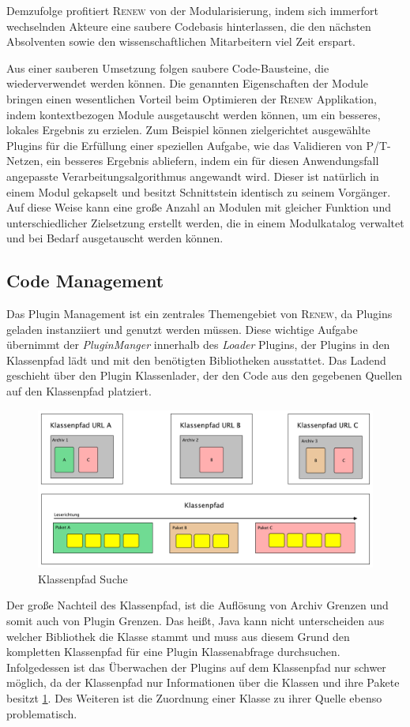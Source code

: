 		Demzufolge profitiert \textsc{Renew} von der Modularisierung, indem sich immerfort wechselnden Akteure eine saubere Codebasis hinterlassen, die den nächsten Absolventen sowie den wissenschaftlichen Mitarbeitern viel Zeit erspart. \bigbreak

		Aus einer sauberen Umsetzung folgen saubere Code-Bausteine, die wiederverwendet werden können. Die genannten Eigenschaften der Module bringen einen wesentlichen Vorteil beim Optimieren der \textsc{Renew} Applikation, indem kontextbezogen Module ausgetauscht werden können, um ein besseres, lokales Ergebnis zu erzielen. Zum Beispiel können zielgerichtet ausgewählte Plugins für die Erfüllung einer speziellen Aufgabe, wie das Validieren von P/T-Netzen, ein besseres Ergebnis abliefern, indem ein für diesen Anwendungsfall angepasste Verarbeitungsalgorithmus angewandt wird. Dieser ist natürlich in einem Modul gekapselt und besitzt Schnittstein identisch zu seinem Vorgänger. Auf diese Weise kann eine große Anzahl an Modulen mit gleicher Funktion und unterschiedlicher Zielsetzung erstellt werden, die in einem Modulkatalog verwaltet und bei Bedarf ausgetauscht werden können.

	\subsection{Code Management}\label{sub:code_managment}
		Das Plugin Management ist ein zentrales Themengebiet von \textsc{Renew}, da Plugins geladen instanziiert und genutzt werden müssen. Diese wichtige Aufgabe übernimmt der \textit{PluginManger} innerhalb des \textit{Loader} Plugins, der Plugins in den Klassenpfad lädt und mit den benötigten Bibliotheken ausstattet. Das Ladend geschieht über den Plugin Klassenlader, der den Code aus den gegebenen Quellen auf den Klassenpfad platziert.\bigbreak
		\begin{figure}[t]
		  \centering
		  \includegraphics[width=\textwidth]{material/images/Klassenpfad.pdf}
		  \caption{Klassenpfad Suche \cite{kothagal2017modular}}
		  \label{fig:CP_Struktur}
		\end{figure}
		Der große Nachteil des Klassenpfad, ist die Auflösung von Archiv Grenzen und somit auch von Plugin Grenzen. Das heißt, Java kann nicht unterscheiden aus welcher Bibliothek die Klasse stammt und muss aus diesem Grund den kompletten Klassenpfad für eine Plugin Klassenabfrage durchsuchen. Infolgedessen ist das Überwachen der Plugins auf dem Klassenpfad nur schwer möglich, da der Klassenpfad nur Informationen über die Klassen und ihre Pakete besitzt \ref{fig:CP_Struktur}. Des Weiteren ist die Zuordnung einer Klasse zu ihrer Quelle ebenso problematisch.\bigbreak

